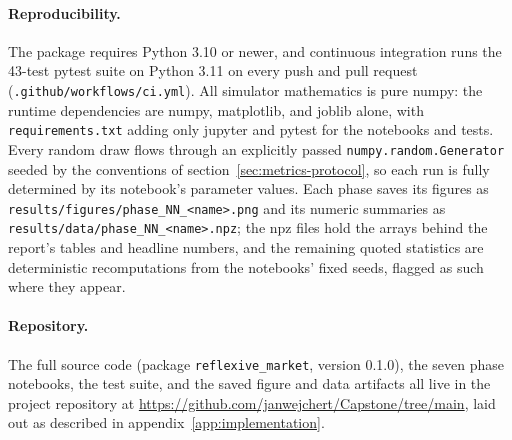 \documentclass[12pt]{article}
\begin{document}
\paragraph{Reproducibility.}
The package requires Python 3.10 or newer, and continuous integration runs the 43-test pytest suite on Python 3.11 on every push and pull request (\texttt{.github/workflows/ci.yml}). %
All simulator mathematics is pure numpy: the runtime dependencies are numpy, matplotlib, and joblib alone, with \texttt{requirements.txt} adding only jupyter and pytest for the notebooks and tests. %
Every random draw flows through an explicitly passed \texttt{numpy.random.Generator} seeded by the conventions of section~\ref{sec:metrics-protocol}, so each run is fully determined by its notebook's parameter values. %
Each phase saves its figures as \texttt{results/figures/phase\_NN\_<name>.png} and its numeric summaries as \texttt{results/data/phase\_NN\_<name>.npz}; the npz files hold the arrays behind the report's tables and headline numbers, and the remaining quoted statistics are deterministic recomputations from the notebooks' fixed seeds, flagged as such where they appear. %

\paragraph{Repository.}
The full source code (package \texttt{reflexive\_market}, version 0.1.0), the seven phase notebooks, the test suite, and the saved figure and data artifacts all live in the project repository at \url{https://github.com/janwejchert/Capstone/tree/main}, laid out as described in appendix~\ref{app:implementation}. %
\end{document}
